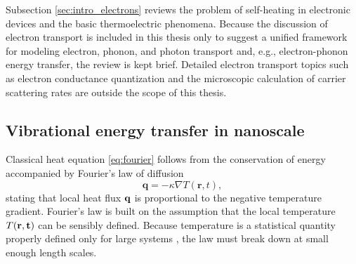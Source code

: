 Subsection \ref{sec:intro_electrons} reviews the problem of self-heating in electronic devices and the basic thermoelectric phenomena. Because the discussion of electron transport is included in this thesis only to suggest a unified framework for modeling electron, phonon, and photon transport and, e.g., electron-phonon energy transfer, the review is kept brief.  Detailed electron transport topics such as electron conductance quantization \cite{landauer57} and the microscopic calculation of carrier scattering rates \cite{ziman} are outside the scope of this thesis. 






\subsection{Vibrational energy transfer in nanoscale}
\label{sec:intro_vib}
Classical heat equation \eqref{eq:fourier} follows from the conservation of energy accompanied by Fourier's law of diffusion \cite{fourier}
\begin{equation}
 \mathbf{q} = -\kappa \nabla T(\mathbf{r},t),
\end{equation}
stating that local heat flux $\mathbf{q}$ is proportional to the negative temperature gradient. Fourier's law is built on the assumption that the local temperature $T(\bf{r},t)$ can be sensibly defined. Because temperature is a statistical quantity properly defined only for large systems \cite{}, the law must break down at small enough length scales. 

